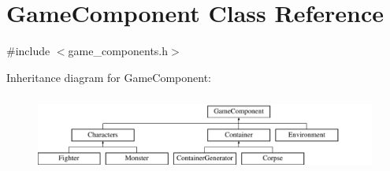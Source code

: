 \hypertarget{class_game_component}{}\section{Game\+Component Class Reference}
\label{class_game_component}


{\ttfamily \#include $<$game\+\_\+components.\+h$>$}

Inheritance diagram for Game\+Component\+:\begin{figure}[H]
\begin{center}
\leavevmode
\includegraphics[height=2.545455cm]{class_game_component}
\end{center}
\end{figure}
